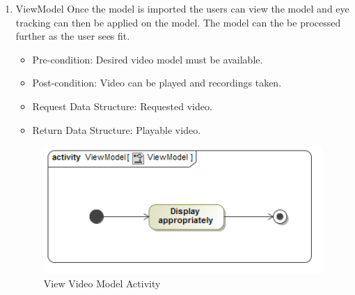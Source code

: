 \begin{enumerate}
			\item{ViewModel}
Once the model is imported the users can view the model and eye tracking can then be applied on the 	model. The model can the be processed further as the user sees fit.
			\begin{itemize}
				\item Pre-condition: Desired video model must be available.
				\item Post-condition: Video can be played and recordings taken.
				\item Request Data Structure: Requested video.
				\item Return Data Structure: Playable video.
			\end{itemize}
			\begin{figure}
				\centering
				\includegraphics[scale=0.5,width=15cm,keepaspectratio]{Diagrams/Activity_Diagram__ViewModel__ViewModel.png}
				\caption{View Video Model Activity}
			\end{figure}
			
			
			

\end{enumerate}
